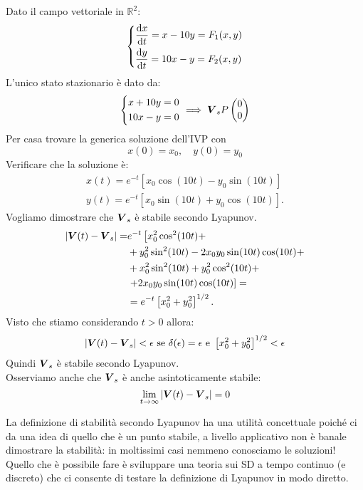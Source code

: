 \noindent
\begin{exmp}[3]
    Dato il campo vettoriale in $\mathbb{R}^2$:
    \[\begin{dcases}
	\frac{\text{d} x}{\text{d} t} = x-10y = F_1(x,y)\\
	\frac{\text{d} y}{\text{d} t} = 10x-y = F_2(x, y)
    \end{dcases}\] 
    L'unico stato stazionario è dato da:
    \[\begin{dcases}
        x + 10 y = 0\\
	10 x - y = 0
    \end{dcases}
    \implies  \boldsymbol{V}_s P \begin{pmatrix} 0 \\ 0 \end{pmatrix} 
\]  
Per casa trovare la generica soluzione dell'IVP con 
\[
    x(0)= x_0, \quad y(0)=y_0
\] Verificare che la soluzione è:
\[\begin{aligned}
    x(t)=e^{-t}\left[x_0\cos (10t)-y_0\sin (10t)\right]\\
    y(t)=e^{-t}\left[x_0\sin (10t)+y_0\cos (10t)\right]
.\end{aligned}\]
Vogliamo dimostrare che $\boldsymbol{V}_s$ è stabile secondo Lyapunov.
\[\begin{aligned}
    \left|\boldsymbol{V} (t)-\boldsymbol{V}_s\right| =& e^{-t}\left[x_0^2\cos^2(10t)+ \right.\\ 
					  &+ y_0^2\sin^2(10t)-2x_0y_0\sin (10t)\cos (10t) + \\
					  &+ x_0^2\sin^2(10t)+ y_0^2\cos^2(10t)+\\ 
					  &\left.+ 2x_0y_0\sin (10t)\cos (10t)\right] = \\
					  &= e^{-t}\left[x_0^2+ y_0^2\right]^{1 /2}
.\end{aligned}\]
Visto che stiamo considerando $t>0$ allora:
\[
    \left|\boldsymbol{V} (t)-\boldsymbol{V}_s\right| <\epsilon  \text{ se } \delta (\epsilon)=\epsilon  \text{ e } \left[x_0^2+y_0^2\right]^{1 /2}<\epsilon
\] 
Quindi $\boldsymbol{V}_s$ è stabile secondo Lyapunov.\\
Osserviamo anche che $\boldsymbol{V}_s$ è anche asintoticamente stabile:
\[
    \lim_{t \to \infty} \left|\boldsymbol{V} (t)-\boldsymbol{V}_s\right|=0
\] 
\end{exmp}
\noindent
La definizione di stabilità secondo Lyapunov ha una utilità concettuale poiché ci da una idea di quello che è un punto stabile, a livello applicativo non è banale dimostrare la stabilità: in moltissimi casi nemmeno conosciamo le soluzioni!\\
Quello che è possibile fare è sviluppare una teoria sui SD a tempo continuo (e discreto) che ci consente di testare la definizione di Lyapunov in modo diretto.

